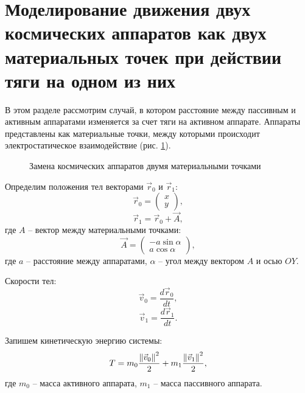 \section{Моделирование движения двух космических аппаратов как двух материальных точек при действии тяги на одном из них}
\label{SEC:2SPH}

В этом разделе рассмотрим случай, в котором расстояние между пассивным и активным аппаратами изменяется за счет тяги на активном аппарате.
Аппараты представлены как материальные точки, между которыми происходит электростатическое взаимодействие (рис. \ref{ris:2sph}).

\begin{figure}[H]
	\caption{Замена космических аппаратов двумя материальными точками}
	\label{ris:2sph}
\end{figure}

Определим положения тел векторами $\vec{r}_0$ и $\vec{r}_1$:
\begin{equation}
\label{eq:2sph_r0}
	\vec{r}_0 = 
	\begin{pmatrix}
		x\\
		y
	\end{pmatrix},
\end{equation}
\begin{equation}
\label{eq:2sph_r1}
	\vec{r}_1 = \vec{r}_0 + \vec{A},
\end{equation}
где $A$ – вектор между материальными точками:
\begin{equation}
\label{eq:2sph_A}
	\vec{A} = 
	\begin{pmatrix}
		- a \sin \alpha \\
		a \cos \alpha
	\end{pmatrix},
\end{equation}
где $a$ – расстояние между аппаратами, $\alpha$ – угол между вектором $A$ и осью $OY$.

Скорости тел:
\begin{equation}
\label{eq:2sph_v0}
	\vec{v}_0 = \frac{d \vec{r}_0}{dt},
\end{equation}
\begin{equation}
\label{eq:2sph_v1}
	\vec{v}_1 = \frac{d \vec{r}_1}{dt}.
\end{equation}

Запишем кинетическую энергию системы:
\begin{equation}
\label{eq:2sph_T}
	T = m_0 \frac{\left\lVert\vec{v}_0\right\rVert^2}{2} + m_1 \frac{\left\lVert\vec{v}_1\right\rVert^2}{2},
\end{equation}
где $m_0$ – масса активного аппарата, $m_1$ – масса пассивного аппарата.

